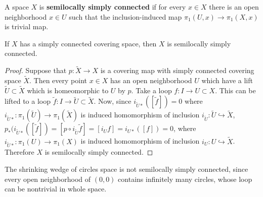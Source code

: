 \begin{defn} A space $X$ is \textbf{semilocally simply connected} if for every $x\in X$ there is an open neighborhood $x\in U$ such that the inclusion-induced map $\pi_1(U,x)\rightarrow \pi_1(X,x)$ is trivial map.
\end{defn}

\begin{prop} If $X$ has a simply connected covering space, then $X$ is semilocally simply connected.
\end{prop}
\begin{proof} Suppose that $p:\tilde{X}\rightarrow X$ is a covering map with simply connected covering space $\tilde{X}$. Then every point $x\in X$ has an open neighborhood $U$ which have a lift $\tilde{U}\subset \tilde{X}$ which is homeomorphic to $U$ by $p$. Take a loop $f:I\rightarrow U\subset X$. This can be lifted to a loop $\tilde{f}:I\rightarrow \tilde{U}\subset \tilde{X}$. Now, since $i_{\tilde{U}*}([\tilde{f}])=0$ where $i_{\tilde{U}*}:\pi_1(\tilde{U})\rightarrow \pi_1(\tilde{X})$ is induced homomorphism of inclusion $i_{\tilde{U}}:\tilde{U}\hookrightarrow \tilde{X}$, $p_*(i_{\tilde{U}*}([\tilde{f}])=[p\circ i_{\tilde{U}}\tilde{f}]=[i_{U}f]=i_{U*}([f])=0$, where $i_{\tilde{U}*}:\pi_1({U})\rightarrow \pi_1({X})$ is induced homomorphism of inclusion $i_{{U}}:{U}\hookrightarrow \tilde{X}$. Therefore $X$ is semilocally simply connected.
\end{proof}

\begin{exmp} The shrinking wedge of circles space is not semilocally simply connected, since every open neighborhood of $(0,0)$ contains infinitely many circles, whose loop can be nontrivial in whole space.
\end{exmp}


